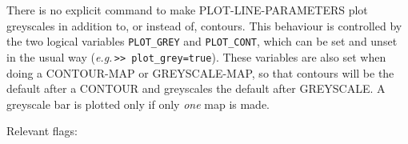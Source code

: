 \documentclass[11pt,twoside]{report}
\newcommand{\eg}{{\it e.g.\,}}
\begin{document}
There is no explicit command to make PLOT-LINE-PARAMETERS plot greyscales in
addition to, or instead of, contours. This behaviour is controlled by the two
logical variables \verb+PLOT_GREY+ and \verb+PLOT_CONT+, which can be set and
unset in the usual way (\eg \verb+>> plot_grey=true+). These variables are also
set when doing a CONTOUR-MAP or GREYSCALE-MAP, so that contours will be the
default after a CONTOUR and greyscales the default after GREYSCALE. A greyscale
bar is plotted only if only {\em one} map is made.

Relevant flags:\\
\end{document}

